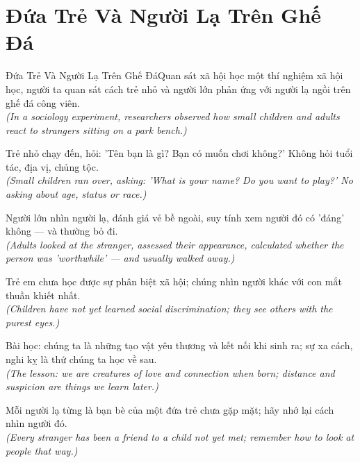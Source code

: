 \section{Đứa Trẻ Và Người Lạ Trên Ghế Đá}
\begin{truyen}{Đứa Trẻ Và Người Lạ Trên Ghế Đá}{Quan sát xã hội học}
 một thí nghiệm xã hội học, người ta quan sát cách trẻ nhỏ và người lớn phản ứng với người lạ ngồi trên ghế đá công viên.\\[4pt]
\textit{(In a sociology experiment, researchers observed how small children and adults react to strangers sitting on a park bench.)}

Trẻ nhỏ chạy đến, hỏi: 'Tên bạn là gì? Bạn có muốn chơi không?' Không hỏi tuổi tác, địa vị, chủng tộc.\\[4pt]
\textit{(Small children ran over, asking: 'What is your name? Do you want to play?' No asking about age, status or race.)}

Người lớn nhìn người lạ, đánh giá vẻ bề ngoài, suy tính xem người đó có 'đáng' không --- và thường bỏ đi.\\[4pt]
\textit{(Adults looked at the stranger, assessed their appearance, calculated whether the person was 'worthwhile' --- and usually walked away.)}

Trẻ em chưa học được sự phân biệt xã hội; chúng nhìn người khác với con mắt thuần khiết nhất.\\[4pt]
\textit{(Children have not yet learned social discrimination; they see others with the purest eyes.)}

Bài học: chúng ta là những tạo vật yêu thương và kết nối khi sinh ra; sự xa cách, nghi kỵ là thứ chúng ta học về sau.\\[4pt]
\textit{(The lesson: we are creatures of love and connection when born; distance and suspicion are things we learn later.)}

\end{truyen}
\begin{baihoc}
  Mỗi người lạ từng là bạn bè của một đứa trẻ chưa gặp mặt; hãy nhớ lại cách nhìn người đó.\\[4pt]
  \textit{(Every stranger has been a friend to a child not yet met; remember how to look at people that way.)}
\end{baihoc}

